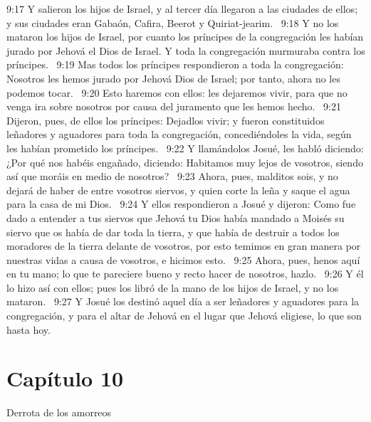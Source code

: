 9:17 Y salieron los hijos de Israel, y al tercer día llegaron a las ciudades de ellos; y sus ciudades eran Gabaón, Cafira, Beerot y Quiriat-jearim.  
9:18 Y no los mataron los hijos de Israel, por cuanto los príncipes de la congregación les habían jurado por Jehová el Dios de Israel. Y toda la congregación murmuraba contra los príncipes.  
9:19 Mas todos los príncipes respondieron a toda la congregación: Nosotros les hemos jurado por Jehová Dios de Israel; por tanto, ahora no les podemos tocar.  
9:20 Esto haremos con ellos: les dejaremos vivir, para que no venga ira sobre nosotros por causa del juramento que les hemos hecho.  
9:21 Dijeron, pues, de ellos los príncipes: Dejadlos vivir; y fueron constituidos leñadores y aguadores para toda la congregación, concediéndoles la vida, según les habían prometido los príncipes.  
9:22 Y llamándolos Josué, les habló diciendo: ¿Por qué nos habéis engañado, diciendo: Habitamos muy lejos de vosotros, siendo así que moráis en medio de nosotros?  
9:23 Ahora, pues, malditos sois, y no dejará de haber de entre vosotros siervos, y quien corte la leña y saque el agua para la casa de mi Dios.  
9:24 Y ellos respondieron a Josué y dijeron: Como fue dado a entender a tus siervos que Jehová tu Dios había mandado a Moisés su siervo que os había de dar toda la tierra, y que había de destruir a todos los moradores de la tierra delante de vosotros, por esto temimos en gran manera por nuestras vidas a causa de vosotros, e hicimos esto.  
9:25 Ahora, pues, henos aquí en tu mano; lo que te pareciere bueno y recto hacer de nosotros, hazlo.  
9:26 Y él lo hizo así con ellos; pues los libró de la mano de los hijos de Israel, y no los mataron.  
9:27 Y Josué los destinó aquel día a ser leñadores y aguadores para la congregación, y para el altar de Jehová en el lugar que Jehová eligiese, lo que son hasta hoy.  
\section*{Capítulo 10}
Derrota de los amorreos  

